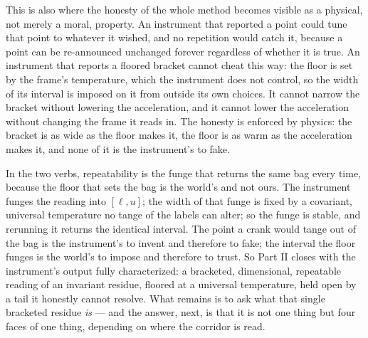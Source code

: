This is also where the honesty of the whole method becomes visible as a physical, not merely a moral, property. An instrument
that reported a point could tune that point to whatever it wished, and no repetition would catch it, because a point can be
re-announced unchanged forever regardless of whether it is true. An instrument that reports a floored bracket cannot cheat
this way: the floor is set by the frame's temperature, which the instrument does not control, so the width of its interval is
imposed on it from outside its own choices. It cannot narrow the bracket without lowering the acceleration, and it cannot
lower the acceleration without changing the frame it reads in. The honesty is enforced by physics: the bracket is as wide as
the floor makes it, the floor is as warm as the acceleration makes it, and none of it is the instrument's to fake.

In the two verbs, repeatability is the funge that returns the same bag every time, because the floor that sets the bag is the
world's and not ours. The instrument funges the reading into $[\ell, u]$; the width of that funge is fixed by a covariant,
universal temperature no tange of the labels can alter; so the funge is stable, and rerunning it returns the identical
interval. The point a crank would tange out of the bag is the instrument's to invent and therefore to fake; the interval the
floor funges is the world's to impose and therefore to trust. So Part II closes with the instrument's output fully
characterized: a bracketed, dimensional, repeatable reading of an invariant residue, floored at a universal temperature, held
open by a tail it honestly cannot resolve. What remains is to ask what that single bracketed residue \emph{is} --- and the
answer, next, is that it is not one thing but four faces of one thing, depending on where the corridor is read.
